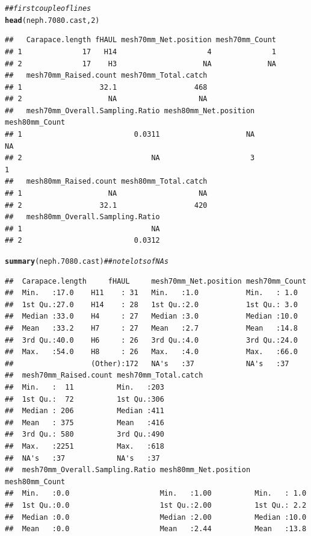 \documentclass[12pt]{article}\usepackage[]{graphicx}\usepackage[]{color}
\makeatletter
\newcommand{\hlnum}[1]{\textcolor[rgb]{0.686,0.059,0.569}{#1}}%
\newcommand{\hlcom}[1]{\textcolor[rgb]{0.678,0.584,0.686}{\textit{#1}}}%
\newcommand{\hlstd}[1]{\textcolor[rgb]{0.345,0.345,0.345}{#1}}%
\newcommand{\hlkwd}[1]{\textcolor[rgb]{0.737,0.353,0.396}{\textbf{#1}}}%
\newenvironment{kframe}{%
 \def\at@end@of@kframe{}%
 \ifinner\ifhmode%
  \def\at@end@of@kframe{\end{minipage}}%
  \begin{minipage}{\columnwidth}%
 \fi\fi%
 \def\FrameCommand##1{\hskip\@totalleftmargin \hskip-\fboxsep
 \colorbox{shadecolor}{##1}\hskip-\fboxsep
     \hskip-\linewidth \hskip-\@totalleftmargin \hskip\columnwidth}%
 \MakeFramed {\advance\hsize-\width
   \@totalleftmargin\z@ \linewidth\hsize
   \@setminipage}}%
 {\par\unskip\endMakeFramed%
 \at@end@of@kframe}
\newenvironment{knitrout}{}{} %
\makeatother
\begin{document}
\begin{knitrout}
\begin{kframe}
\begin{alltt}
\hlcom{## first couple of lines}
\hlkwd{head}\hlstd{(neph.7080.cast,} \hlnum{2}\hlstd{)}
\end{alltt}
\begin{verbatim}
##   Carapace.length fHAUL mesh70mm_Net.position mesh70mm_Count
## 1              17   H14                     4              1
## 2              17    H3                    NA             NA
##   mesh70mm_Raised.count mesh70mm_Total.catch
## 1                  32.1                  468
## 2                    NA                   NA
##   mesh70mm_Overall.Sampling.Ratio mesh80mm_Net.position mesh80mm_Count
## 1                          0.0311                    NA             NA
## 2                              NA                     3              1
##   mesh80mm_Raised.count mesh80mm_Total.catch
## 1                    NA                   NA
## 2                  32.1                  420
##   mesh80mm_Overall.Sampling.Ratio
## 1                              NA
## 2                          0.0312
\end{verbatim}
\begin{alltt}
\hlkwd{summary}\hlstd{(neph.7080.cast)} \hlcom{## note lots of NAs}
\end{alltt}
\begin{verbatim}
##  Carapace.length     fHAUL     mesh70mm_Net.position mesh70mm_Count
##  Min.   :17.0    H11    : 31   Min.   :1.0           Min.   : 1.0  
##  1st Qu.:27.0    H14    : 28   1st Qu.:2.0           1st Qu.: 3.0  
##  Median :33.0    H4     : 27   Median :3.0           Median :10.0  
##  Mean   :33.2    H7     : 27   Mean   :2.7           Mean   :14.8  
##  3rd Qu.:40.0    H6     : 26   3rd Qu.:4.0           3rd Qu.:24.0  
##  Max.   :54.0    H8     : 26   Max.   :4.0           Max.   :66.0  
##                  (Other):172   NA's   :37            NA's   :37    
##  mesh70mm_Raised.count mesh70mm_Total.catch
##  Min.   :  11          Min.   :203         
##  1st Qu.:  72          1st Qu.:306         
##  Median : 206          Median :411         
##  Mean   : 375          Mean   :416         
##  3rd Qu.: 580          3rd Qu.:490         
##  Max.   :2251          Max.   :618         
##  NA's   :37            NA's   :37          
##  mesh70mm_Overall.Sampling.Ratio mesh80mm_Net.position mesh80mm_Count
##  Min.   :0.0                     Min.   :1.00          Min.   : 1.0  
##  1st Qu.:0.0                     1st Qu.:2.00          1st Qu.: 2.2  
##  Median :0.0                     Median :2.00          Median :10.0  
##  Mean   :0.0                     Mean   :2.44          Mean   :13.8  

\end{verbatim}
\end{kframe}
\end{knitrout}
\end{document}
